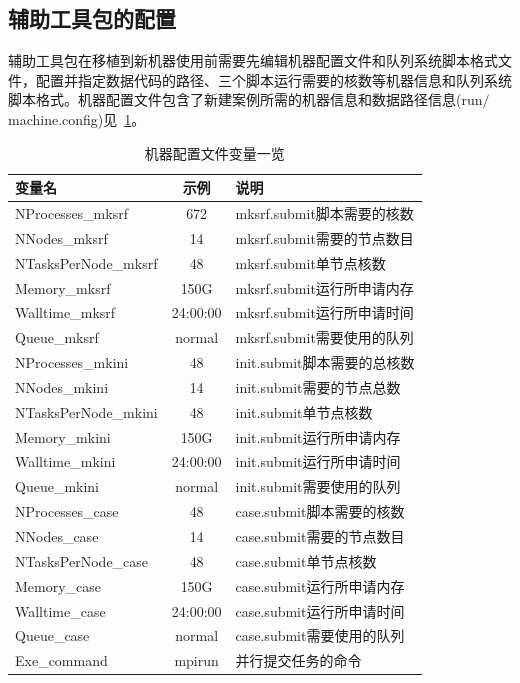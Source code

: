 \subsection{辅助工具包的配置}

辅助工具包在移植到新机器使用前需要先编辑机器配置文件和队列系统脚本格式文件，配置并指定数据代码的路径、三个脚本运行需要的核数等机器信息和队列系统脚本格式。机器配置文件包含了新建案例所需的机器信息和数据路径信息(run$\slash$machine.config)见~\ref{table_machineconfig}。

\begin{table}[!htbp]
\caption{机器配置文件变量一览} \label{table_machineconfig}
\centering \renewcommand{\arraystretch}{1.2}
\begin{tabular}{lcp{}}
\toprule
\textbf{变量名} & \textbf{示例} & \textbf{说明} \\ \midrule
NProcesses\_mksrf & 672 & mksrf.submit脚本需要的核数 \\
NNodes\_mksrf & 14 & mksrf.submit需要的节点数目 \\
NTasksPerNode\_mksrf & 48 & mksrf.submit单节点核数 \\
Memory\_mksrf & 150G & mksrf.submit运行所申请内存 \\
Walltime\_mksrf & 24:00:00 & mksrf.submit运行所申请时间 \\
Queue\_mksrf & normal & mksrf.submit需要使用的队列 \\
NProcesses\_mkini & 48 &init.submit脚本需要的总核数 \\
NNodes\_mkini & 14 & init.submit需要的节点总数 \\
NTasksPerNode\_mkini & 48 & init.submit单节点核数 \\
Memory\_mkini & 150G & init.submit运行所申请内存 \\
Walltime\_mkini & 24:00:00 & init.submit运行所申请时间 \\
Queue\_mkini & normal & init.submit需要使用的队列 \\
NProcesses\_case & 48 & case.submit脚本需要的核数 \\
NNodes\_case & 14 & case.submit需要的节点数目 \\
NTasksPerNode\_case & 48 & case.submit单节点核数 \\
Memory\_case & 150G & case.submit运行所申请内存 \\
Walltime\_case & 24:00:00 & case.submit运行所申请时间 \\
Queue\_case & normal & case.submit需要使用的队列 \\
Exe\_command & mpirun & 并行提交任务的命令 \\

\end{tabular}
\end{table}
